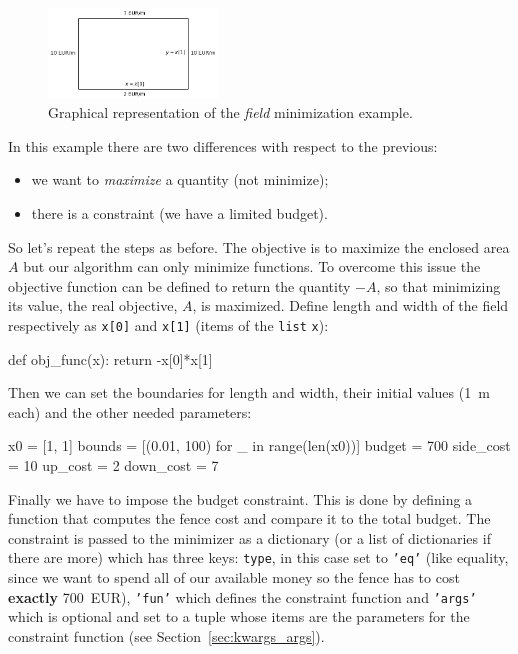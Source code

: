 \begin{figure}[ht]
\centering
\includegraphics[width=0.4\textwidth]{figures/field.png}
\caption{Graphical representation of the \emph{field} minimization example.}
\label{fig:field}
\end{figure}

In this example there are two differences with respect to the previous:

\begin{itemize}
\tightlist
\item we want to \emph{maximize} a quantity (not minimize);
\item there is a constraint (we have a limited budget).
\end{itemize}

So let's repeat the steps as before. The objective is to maximize the enclosed area $A$ but our algorithm can only minimize functions. To overcome this issue the objective function can be defined to return the quantity $-A$, so that minimizing its value, the real objective, $A$, is maximized. 
Define length and width of the field respectively as \texttt{x[0]} and \texttt{x[1]} (items of the \texttt{list} \texttt{x}):

\begin{ipython}
def obj_func(x):
    return -x[0]*x[1]
\end{ipython}

Then we can set the boundaries for length and width, their initial values (1~m each) and the other needed parameters:

\begin{ipython}
x0 = [1, 1]
bounds = [(0.01, 100) for _ in range(len(x0))]
budget = 700
side_cost = 10
up_cost = 2
down_cost = 7
\end{ipython}

Finally we have to impose the budget constraint. This is done by defining a function that computes the fence cost and compare it to the total budget. 
The constraint is passed to the minimizer as a dictionary (or a list  of dictionaries if there are more) which has three keys: \texttt{type}, in this case set to \texttt{'eq'} (like equality, since we want to spend all of our available money so the fence has to cost \textbf{exactly} 700~EUR), \texttt{'fun'} which defines the constraint function and \texttt{'args'} which is optional and set to a tuple whose items are the parameters for the constraint function (see Section~\ref{sec:kwargs_args}).

